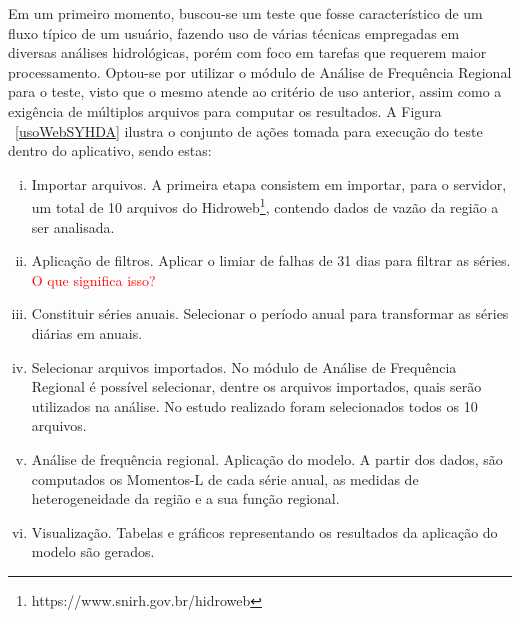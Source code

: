\documentclass[12pt,english,brazil]{article}
\begin{document}
Em um primeiro momento, buscou-se um teste que fosse característico de um fluxo típico de um usuário, fazendo uso de várias técnicas empregadas em diversas análises hidrológicas, porém com foco em tarefas que requerem maior processamento. Optou-se por utilizar o módulo de Análise de Frequência Regional para o teste, visto que o mesmo atende ao critério de uso anterior, assim como a exigência de múltiplos arquivos para computar os resultados. A Figura ~\ref{usoWebSYHDA} ilustra o conjunto de ações tomada para execução do teste dentro do aplicativo, sendo estas:


\begin{enumerate}[i.]
  \item Importar arquivos. A primeira etapa consistem em importar, para o servidor, um total de 10 arquivos do Hidroweb\footnote{https://www.snirh.gov.br/hidroweb}, contendo dados de vazão da região a ser analisada.
  \item Aplicação de filtros. Aplicar o limiar de falhas de 31 dias para filtrar as séries. \textcolor{red}{O que significa isso?}
  \item Constituir séries anuais. Selecionar o período anual para transformar as séries diárias em anuais.
  \item Selecionar arquivos importados. No módulo de Análise de Frequência Regional  é possível selecionar, dentre os arquivos importados, quais serão utilizados na análise. No estudo realizado foram selecionados todos os 10 arquivos.
  \item Análise de frequência regional. Aplicação do modelo. A partir dos dados, são computados os Momentos-L de cada série anual, as medidas de heterogeneidade da região e a sua função regional.
  \item Visualização. Tabelas e gráficos representando os resultados da aplicação do modelo são gerados.
\end{enumerate}
\end{document}
